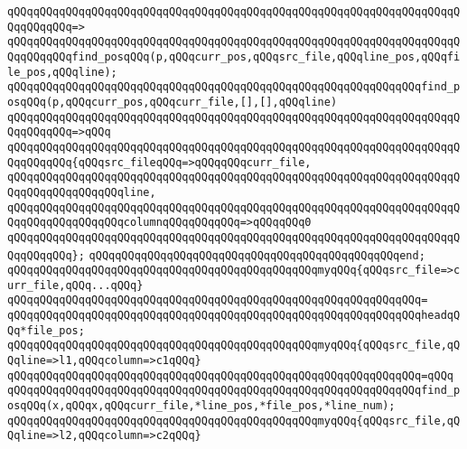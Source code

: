 \verb|qQQqqQQqqQQqqQQqqQQqqQQqqQQqqQQqqQQqqQQqqQQqqQQqqQQqqQQqqQQqqQQqqQQqqQQqqQQqqQQq=>|\newline
\verb|qQQqqQQqqQQqqQQqqQQqqQQqqQQqqQQqqQQqqQQqqQQqqQQqqQQqqQQqqQQqqQQqqQQqqQQqqQQqqQQqfind_posqQQq(p,qQQqcurr_pos,qQQqsrc_file,qQQqline_pos,qQQqfile_pos,qQQqline);|\newline
\newline
\verb|qQQqqQQqqQQqqQQqqQQqqQQqqQQqqQQqqQQqqQQqqQQqqQQqqQQqqQQqqQQqqQQqfind_posqQQq(p,qQQqcurr_pos,qQQqcurr_file,[],[],qQQqline)|\newline
\verb|qQQqqQQqqQQqqQQqqQQqqQQqqQQqqQQqqQQqqQQqqQQqqQQqqQQqqQQqqQQqqQQqqQQqqQQqqQQqqQQq=>qQQq|\newline
\verb|qQQqqQQqqQQqqQQqqQQqqQQqqQQqqQQqqQQqqQQqqQQqqQQqqQQqqQQqqQQqqQQqqQQqqQQqqQQqqQQq{qQQqsrc_fileqQQq=>qQQqqQQqcurr_file,|\newline
\verb|qQQqqQQqqQQqqQQqqQQqqQQqqQQqqQQqqQQqqQQqqQQqqQQqqQQqqQQqqQQqqQQqqQQqqQQqqQQqqQQqqQQqqQQqline,|\newline
\verb|qQQqqQQqqQQqqQQqqQQqqQQqqQQqqQQqqQQqqQQqqQQqqQQqqQQqqQQqqQQqqQQqqQQqqQQqqQQqqQQqqQQqqQQqcolumnqQQqqQQqqQQq=>qQQqqQQq0|\newline
\verb|qQQqqQQqqQQqqQQqqQQqqQQqqQQqqQQqqQQqqQQqqQQqqQQqqQQqqQQqqQQqqQQqqQQqqQQqqQQqqQQq};|\newline
\verb|qQQqqQQqqQQqqQQqqQQqqQQqqQQqqQQqqQQqqQQqqQQqqQQqend;|\newline
\newline
\verb|qQQqqQQqqQQqqQQqqQQqqQQqqQQqqQQqqQQqqQQqqQQqqQQqmyqQQq{qQQqsrc_file=>curr_file,qQQq...qQQq}|\newline
\verb|qQQqqQQqqQQqqQQqqQQqqQQqqQQqqQQqqQQqqQQqqQQqqQQqqQQqqQQqqQQqqQQq=|\newline
\verb|qQQqqQQqqQQqqQQqqQQqqQQqqQQqqQQqqQQqqQQqqQQqqQQqqQQqqQQqqQQqqQQqheadqQQq*file_pos;|\newline
\newline
\verb|qQQqqQQqqQQqqQQqqQQqqQQqqQQqqQQqqQQqqQQqqQQqqQQqmyqQQq{qQQqsrc_file,qQQqline=>l1,qQQqcolumn=>c1qQQq}|\newline
\verb|qQQqqQQqqQQqqQQqqQQqqQQqqQQqqQQqqQQqqQQqqQQqqQQqqQQqqQQqqQQqqQQq=qQQq|\newline
\verb|qQQqqQQqqQQqqQQqqQQqqQQqqQQqqQQqqQQqqQQqqQQqqQQqqQQqqQQqqQQqqQQqfind_posqQQq(x,qQQqx,qQQqcurr_file,*line_pos,*file_pos,*line_num);|\newline
\newline
\verb|qQQqqQQqqQQqqQQqqQQqqQQqqQQqqQQqqQQqqQQqqQQqqQQqmyqQQq{qQQqsrc_file,qQQqline=>l2,qQQqcolumn=>c2qQQq}|\newline
